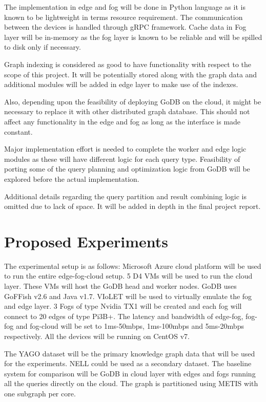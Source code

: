 \documentclass[conference]{IEEEtran}
\begin{document}
The implementation in edge and fog will be done in Python language as it is known to be lightweight in terms resource requirement. The communication between the devices is handled through gRPC framework. Cache data in Fog layer will be in-memory as the fog layer is known to be reliable and will be spilled to disk only if necessary.

Graph indexing is considered as good to have functionality with respect to the scope of this project. It will be potentially stored along with the graph data and additional modules will be added in edge layer to make use of the indexes.

Also, depending upon the feasibility of deploying GoDB on the cloud, it might be necessary to replace it with other distributed graph database. This should not affect any functionality in the edge and fog as long as the interface is made constant.

Major implementation effort is needed to complete the worker and edge logic modules as these will have different logic for each query type. Feasibility of porting some of the query planning and optimization logic from GoDB will be explored before the actual implementation.

Additional details regarding the query partition and result combining logic is omitted due to lack of space. It will be added in depth in the final project report.

\section{Proposed Experiments}

The experimental setup is as follows: Microsoft Azure cloud platform will be used to run the entire edge-fog-cloud setup. 5 D4 VMs will be used to run the cloud layer. These VMs will host the GoDB head and worker nodes. GoDB uses GoFFish v2.6 and Java v1.7. VIoLET\cite{DBLP:journals/corr/abs-1806-06032} will be used to virtually emulate the fog and edge layer. 3 Fogs of type Nvidia TX1 will be created and each fog will connect to 20 edges of type Pi3B+. The latency and bandwidth of edge-fog, fog-fog and fog-cloud will be set to 1ms-50mbps, 1ms-100mbps and 5ms-20mbps respectively. All the devices will be running on CentOS v7.

The YAGO dataset will be the primary knowledge graph data that will be used for the experiments. NELL\cite{Mitchell:2018:NL:3210350.3191513} could be used as a secondary dataset. The baseline system for comparison will be GoDB in cloud layer with edges and fogs running all the queries directly on the cloud. The graph is partitioned using METIS with one subgraph per core.
\end{document}
